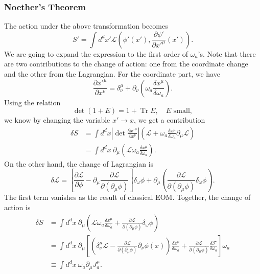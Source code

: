 \documentclass[aps,prb,superscriptaddress,nofootinbib]{revtex4}
\def \Tr{\operatorname{Tr}}
\begin{document}
\subsubsection{Noether's Theorem}
The action under the above transformation becomes
\begin{equation}
	S' = \int d^d x' \mathcal L\left(\phi'(x'),\frac{\partial \phi'}{\partial {x'}^\mu}(x')\right).
\end{equation}
We are going to expand the expression to the first order of $\omega_a$'s.
Note that there are two contributions to the change of action: one from the coordinate change and the other from the Lagrangian.
For the coordinate part, we have
\begin{equation}
	\frac{\partial {x'}^\mu}{\partial x^\nu}
	= \delta^\mu_\nu + \partial_\nu\left(\omega_a \frac{\delta x^\mu}{\delta \omega_a}\right).
\end{equation}
Using the relation 
\begin{equation}
	\det(1+E) = 1 + \Tr E, \quad E\text{ small},
\end{equation}
we know by changing the variable $x' \rightarrow x$, we get a contribution
\begin{equation}
\begin{aligned}
	\delta S 
	&= \int d^d x \left|\det \frac{\partial {x'}^\mu}{\partial x^\nu}\right|\left(\mathcal L + \omega_a \frac{\delta x^\mu}{\delta \omega_a} \partial_\mu \mathcal L \right)  \\
	&= \int d^d x \ \partial_\mu \left(\mathcal L \omega_a \frac{\delta x^\mu}{\delta \omega_a}\right).
\end{aligned}
\end{equation}
On the other hand, the change of Lagrangian is
\begin{equation}
	{\delta} \mathcal L =
	\left[\frac{\partial \mathcal L}{\partial \phi} -\partial_\mu \frac{\partial\mathcal L}{\partial(\partial_\mu\phi)} \right]\delta_\omega \phi + \partial_\mu \left(\frac{\partial\mathcal L}{\partial(\partial_\mu\phi)} \delta_\omega \phi \right).
\end{equation}
The first term vanishes as the result of classical EOM.
Together, the change of action is
\begin{equation}
\begin{aligned}
	\delta S 
	&= \int d^d x \ \partial_\mu \left(\mathcal L \omega_a \frac{\delta x^\mu}{\delta \omega_a}+\frac{\partial\mathcal L}{\partial(\partial_\mu\phi)} \delta_\omega \phi \right) \\
	&= \int d^d x \ \partial_\mu \left[\left(\delta^\mu_\nu \mathcal L - \frac{\partial\mathcal L}{\partial(\partial_\mu\phi)}\partial_\nu \phi(x) \right)\frac{\delta x^\nu}{\delta\omega_a}  + \frac{\partial\mathcal L}{\partial(\partial_\mu\phi)}\frac{\delta\mathcal F}{\delta\omega_a}\right] \omega_a \\
	&\equiv \int d^d x \ \omega_a  \partial_\mu J^\mu_a.
\end{aligned} 
\end{equation}
\end{document}
